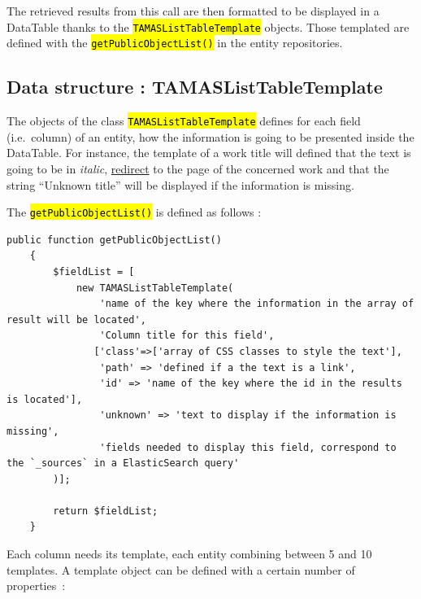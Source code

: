 \documentclass[a4paper,12pt,twoside]{book}
\let\OldTexttt\texttt
\renewcommand{\texttt}[1]{\OldTexttt{\hl{#1}}}
\begin{document}
The retrieved results from this call are then formatted to be displayed in a DataTable thanks to the \texttt{TAMASListTableTemplate} objects. Those templated are defined with the \texttt{getPublicObjectList()} in the entity repositories.

			\subsection{Data structure : TAMASListTableTemplate}\label{data-structure-tamaslisttabletemplate}

The objects of the class \texttt{TAMASListTableTemplate} defines for each field (i.e.~column) of an entity, how the information is going to be presented inside the DataTable. For instance, the template of a work title will defined that the text is going to be in \emph{italic}, \href{}{redirect} to the page of the concerned work and that the string ``Unknown title'' will be displayed if the information is missing.

The \texttt{getPublicObjectList()} is defined as follows :

\begin{lstlisting}
public function getPublicObjectList()
    {
        $fieldList = [
            new TAMASListTableTemplate(
                'name of the key where the information in the array of result will be located',
                'Column title for this field',
               ['class'=>['array of CSS classes to style the text'],
                'path' => 'defined if a the text is a link',
                'id' => 'name of the key where the id in the results is located'],
                'unknown' => 'text to display if the information is missing',
                'fields needed to display this field, correspond to the `_sources` in a ElasticSearch query'
        )];

        return $fieldList;
    }
\end{lstlisting}

Each column needs its template, each entity combining between 5 and 10 templates. A template object can be defined with a certain number of properties~:
\end{document}
